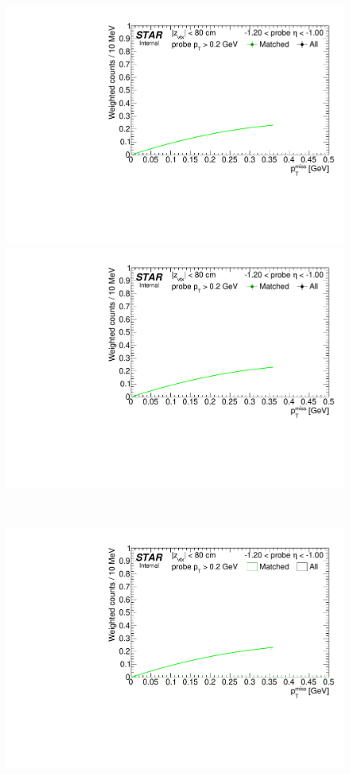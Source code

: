 \begin{figure}[ht]\ContinuedFloat
\centering
\parbox{0.495\textwidth}{
  \centering
  
  \includegraphics[width=\linewidth,page=10]{graphics/systematicsEfficiency/TOF_tagAndProbe/Fitting_effVsEta_data.CPT.pdf}\\
  \includegraphics[width=\linewidth,page=11]{graphics/systematicsEfficiency/TOF_tagAndProbe/Fitting_effVsEta_data.CPT.pdf}
}~
\parbox{0.495\textwidth}{
  \centering
  \includegraphics[width=\linewidth,page=10]{graphics/systematicsEfficiency/TOF_tagAndProbe/Fitting_effVsEta_mc.CPT.pdf}\\
}
\end{figure}
